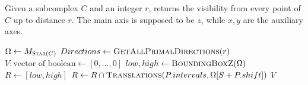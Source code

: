 





\begin{algorithm}
  \caption{Given a subcomplex $C$ and an integer $r$, returns the visibility from every point of $C$ up to distance $r$. The main axis is supposed to be $z$, while $x,y$ are the auxiliary axes.}
  \label{alg:visibility}
  \begin{algorithmic}
    \State $\Omega \gets M_{\Call{Star}{C}}$ 
    \State $Directions \gets \Call{GetAllPrimalDirections}{r}$
    \State $V: \text{vector of boolean} \gets [0, \ldots, 0]$ 
    \State $low, high \gets \Call{BoundingBoxZ}{\Omega}$
    \State $R \gets [low, high]$
    \State $R \gets R \cap \Call{Translations}{P.intervals,\Omega[S + P.shift]}$
    \EndFor
    \State {}
    \EndFor
    \EndFor
    \State \Return $V$
    \EndFunction
  \end{algorithmic}
\end{algorithm}


